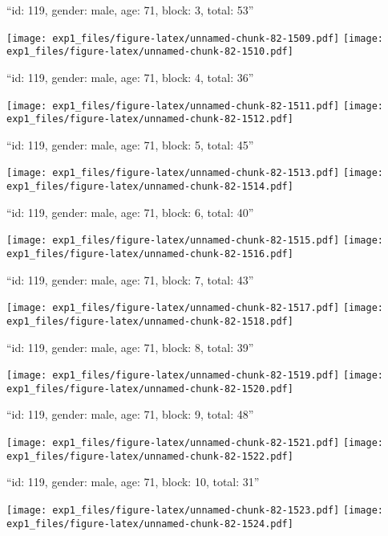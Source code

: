 \documentclass[11pt,,]{article}
\begin{document}
\newpage
[1] 

``id: 119, gender: male, age: 71, block: 3, total: 53''

\texttt{[image: exp1\_files/figure-latex/unnamed-chunk-82-1509.pdf]}
\texttt{[image: exp1\_files/figure-latex/unnamed-chunk-82-1510.pdf]}

\newpage
[1] 

``id: 119, gender: male, age: 71, block: 4, total: 36''

\texttt{[image: exp1\_files/figure-latex/unnamed-chunk-82-1511.pdf]}
\texttt{[image: exp1\_files/figure-latex/unnamed-chunk-82-1512.pdf]}

\newpage
[1] 

``id: 119, gender: male, age: 71, block: 5, total: 45''

\texttt{[image: exp1\_files/figure-latex/unnamed-chunk-82-1513.pdf]}
\texttt{[image: exp1\_files/figure-latex/unnamed-chunk-82-1514.pdf]}

\newpage
[1] 

``id: 119, gender: male, age: 71, block: 6, total: 40''

\texttt{[image: exp1\_files/figure-latex/unnamed-chunk-82-1515.pdf]}
\texttt{[image: exp1\_files/figure-latex/unnamed-chunk-82-1516.pdf]}

\newpage
[1] 

``id: 119, gender: male, age: 71, block: 7, total: 43''

\texttt{[image: exp1\_files/figure-latex/unnamed-chunk-82-1517.pdf]}
\texttt{[image: exp1\_files/figure-latex/unnamed-chunk-82-1518.pdf]}

\newpage
[1] 

``id: 119, gender: male, age: 71, block: 8, total: 39''

\texttt{[image: exp1\_files/figure-latex/unnamed-chunk-82-1519.pdf]}
\texttt{[image: exp1\_files/figure-latex/unnamed-chunk-82-1520.pdf]}

\newpage
[1] 

``id: 119, gender: male, age: 71, block: 9, total: 48''

\texttt{[image: exp1\_files/figure-latex/unnamed-chunk-82-1521.pdf]}
\texttt{[image: exp1\_files/figure-latex/unnamed-chunk-82-1522.pdf]}

\newpage
[1] 

``id: 119, gender: male, age: 71, block: 10, total: 31''

\texttt{[image: exp1\_files/figure-latex/unnamed-chunk-82-1523.pdf]}
\texttt{[image: exp1\_files/figure-latex/unnamed-chunk-82-1524.pdf]}
\end{document}
